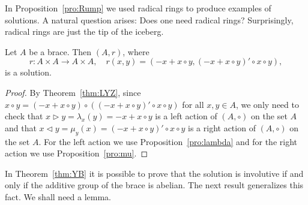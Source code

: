 

In Proposition~\ref{pro:Rump} we used radical rings to produce examples of solutions. 
A natural question arises: Does one need radical rings? Surprisingly, 
radical rings are just the tip of the iceberg. 

\begin{theorem}
\label{thm:YB}
Let $A$ be a brace. Then 
$(A,r)$, where 
\[
r\colon A\times A\to A\times A,\quad
r(x,y)=( -x+x\circ y,(-x+x\circ y)'\circ x\circ y),
\]
is a solution. 
\end{theorem}

\begin{proof}
    By Theorem~\ref{thm:LYZ}, 
    since $x\circ y=(-x+x\circ y)\circ ((-x+x\circ y)'\circ x\circ y)$ for all $x,y\in A$, 
    we only need to check that 
    $x\rhd y=\lambda_x(y)=-x+x\circ y$ 
    is a left action of $(A,\circ)$ on the set $A$ 
    and that $x\lhd y=\mu_y(x)=(-x+x\circ y)'\circ x\circ y$ 
    is a right action of $(A,\circ)$ on the set $A$. For the left action we use 
    Proposition~\ref{pro:lambda} and for the right action we use Proposition~\ref{pro:mu}.
\end{proof}

In Theorem~\ref{thm:YB} it is possible to prove that the solution 
is involutive if and only if the additive group of the brace is abelian. 
The next result generalizes this fact. We shall need a lemma.




